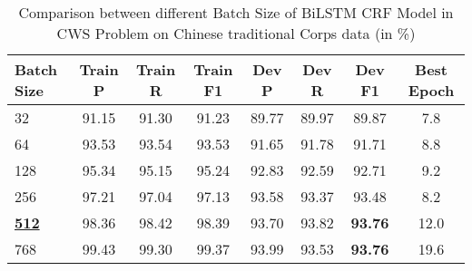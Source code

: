 \begin{table*}[htbp!]
    \centering
    \begin{tabular}{lccccccc}
    \midrule
    Batch Size  &  Train P          & Train R        & Train F1       & Dev P      & Dev R & Dev F1 &Best Epoch\\
    \midrule
    32         & 91.15   & 91.30   & 91.23    & 89.77 & 89.97 & 89.87     & 7.8        \\
    64         & 93.53   & 93.54   & 93.53    & 91.65 & 91.78 & 91.71     & 8.8        \\
    128        & 95.34   & 95.15   & 95.24    & 92.83 & 92.59 & 92.71     & 9.2        \\
    256        & 97.21   & 97.04   & 97.13    & 93.58 & 93.37 & 93.48     & 8.2        \\
    \underline{\bf512}& 98.36   & 98.42   & 98.39    & 93.70 & 93.82 & \bf93.76  & 12.0\\
    768        & 99.43   & 99.30   & 99.37    & 93.99 & 93.53 & \bf93.76  & 19.6       \\

    \bottomrule
    \end{tabular}
\caption{Comparison between different Batch Size of BiLSTM CRF Model in CWS Problem on Chinese traditional Corps data (in \%)}
\label{tab:batchSize}
\end{table*}
